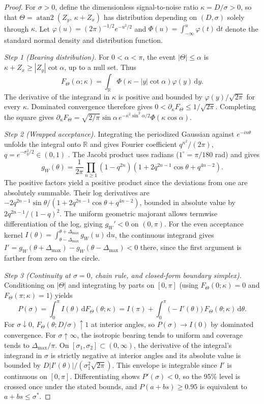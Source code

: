 \begin{proof}
For $\sigma > 0$, define the dimensionless signal-to-noise ratio $\kappa = D/\sigma > 0$, so that $\Theta = \operatorname{atan2}(Z_y,\, \kappa + Z_x)$ has distribution depending on $(D,\sigma)$ solely through $\kappa$. Let $\varphi(u)=(2\pi)^{-1/2}e^{-u^2/2}$ and $\Phi(u)=\int_{-\infty}^u\varphi(t)\,\mathrm{d}t$ denote the standard normal density and distribution function.

\emph{Step 1 (Bearing distribution).}
For $0<\alpha<\pi$, the event $|\Theta|\le\alpha$ is $\kappa+Z_x\ge |Z_y|\cot\alpha$, up to a null set. Thus
\[
F_\Theta(\alpha;\kappa)=\int_{\mathbb R}\Phi(\kappa-|y|\cot\alpha)\varphi(y)\,\mathrm{d}y.
\]
The derivative of the integrand in $\kappa$ is positive and bounded by $\varphi(y)/\sqrt{2\pi}$ for every $\kappa$. Dominated convergence therefore gives $0<\partial_\kappa F_\Theta\le 1/\sqrt{2\pi}$. Completing the square gives $\partial_\kappa F_\Theta=\sqrt{2/\pi}\sin\alpha\,e^{-\kappa^2\sin^2\alpha/2}\Phi(\kappa\cos\alpha)$.

\emph{Step 2 (Wrapped acceptance).}
Integrating the periodized Gaussian against $e^{-in\theta}$ unfolds the integral onto $\mathbb R$ and gives Fourier coefficient $q^{n^2}/(2\pi)$, $q=e^{-\sigma_g^2/2}\in(0,1)$ \cite{dlmf}. The Jacobi product uses radians ($1^\circ=\pi/180$ rad) and gives
\[
g_W(\theta)=\frac1{2\pi}\prod_{n\ge1}(1-q^{2n})
   (1+2q^{2n-1}\cos\theta+q^{4n-2}).
\]
The positive factors yield a positive product since the deviations from one are absolutely summable. Their log derivatives are $-2q^{2n-1}\sin\theta/(1+2q^{2n-1}\cos\theta+q^{4n-2})$, bounded in absolute value by $2q^{2n-1}/(1-q)^2$. The uniform geometric majorant allows termwise differentiation of the log, giving $g_W'<0$ on $(0,\pi)$. For the even acceptance kernel $I(\theta)=\int_{\theta-\Delta_{\max}}^{\theta+\Delta_{\max}} g_W(u)\,\mathrm{d}u$, the continuous integrand gives $I'=g_W(\theta+\Delta_{\max})-g_W(\theta-\Delta_{\max})<0$ there, since the first argument is farther from zero on the circle.

\emph{Step 3 (Continuity at $\sigma=0$, chain rule, and closed-form boundary simplex).} Conditioning on $|\Theta|$ and integrating by parts on $[0,\pi]$ (using $F_\Theta(0;\kappa)=0$ and $F_\Theta(\pi;\kappa)=1$) yields
\[
P(\sigma) = \int_0^\pi I(\theta)\,\mathrm{d}F_\Theta(\theta;\kappa)
= I(\pi) + \int_0^\pi \bigl(-I'(\theta)\bigr)\,F_\Theta(\theta;\kappa)\,\mathrm{d}\theta.
\]
For $\sigma\downarrow0$, $F_\Theta(\theta;D/\sigma)\uparrow1$ at interior angles, so $P(\sigma)\to I(0)$ by dominated convergence. For $\sigma\uparrow\infty$, the isotropic bearing tends to uniform and coverage tends to $\Delta_{\max}/\pi$. On $[\sigma_1,\sigma_2]\subset(0,\infty)$, the derivative of the integral's integrand in $\sigma$ is strictly negative at interior angles and its absolute value is bounded by $D|I'(\theta)|/(\sigma_1^2\sqrt{2\pi})$. This envelope is integrable since $I'$ is continuous on $[0,\pi]$. Differentiating shows $P'(\sigma)<0$, so the 95\% level is crossed once under the stated bounds, and $P(a+bs)\ge0.95$ is equivalent to $a+bs\le\sigma^*$.
\end{proof}

